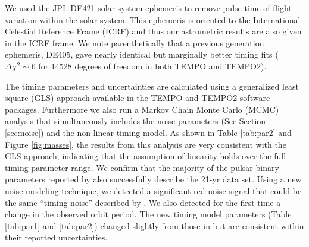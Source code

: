 We used the JPL DE421 solar system ephemeris \citep{fwb09} to remove pulse
time-of-flight variation within the solar system. This ephemeris is oriented
to the International Celestial Reference Frame (ICRF) and thus our astrometric
results are also given in the ICRF frame. We note parenthetically that a
previous generation ephemeris, DE405, gave nearly identical but marginally
better timing fits ($\Delta\chi^2\sim6$ for 14528 degrees of freedom in both
{\sc TEMPO} and {\sc TEMPO2}). 

The timing parameters and uncertainties are calculated using a generalized least
square (GLS) approach available in the {\sc TEMPO} and {\sc TEMPO2} software packages. 
Furthermore we also run a Markov Chain Monte Carlo (MCMC) \citep[similar to][]{lah+14, vv14} 
analysis that simultaneously 
includes the noise parameters (See Section \ref{sec:noise}) and the non-linear timing model. 
As shown in Table \ref{tab:par2} and Figure \ref{fig:masses}, the results from this analysis
are very consistent with the GLS approach, indicating that the assumption of linearity holds
over the full timing parameter range.
We confirm that the majority of the pulsar-binary parameters reported by
\citet{sns+05} also successfully describe the 21-yr data set. Using a new
noise modeling technique, we detected 
a significant red noise signal that could be the same ``timing noise''
described by \citet{sns+05}.
We also detected for the first time a change in the observed orbit period.
The new timing model parameters (Table \ref{tab:par1} and \ref{tab:par2}) changed slightly from
those in \citet{sns+05} but are consistent within their reported uncertainties.




